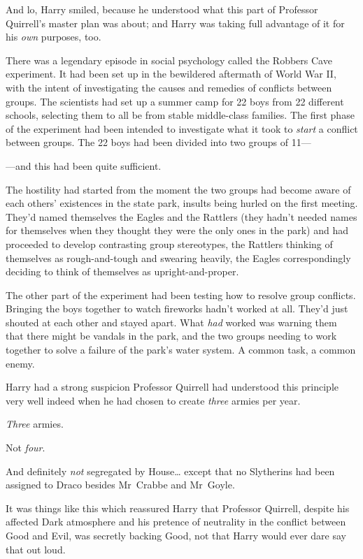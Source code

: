 And lo, Harry smiled, because he understood what this part of Professor Quirrell's master plan was about; and Harry was taking full advantage of it for his \emph{own} purposes, too.

There was a legendary episode in social psychology called the Robbers Cave experiment. It had been set up in the bewildered aftermath of World War II, with the intent of investigating the causes and remedies of conflicts between groups. The scientists had set up a summer camp for 22 boys from 22 different schools, selecting them to all be from stable middle-class families. The first phase of the experiment had been intended to investigate what it took to \emph{start} a conflict between groups. The 22 boys had been divided into two groups of 11—

—and this had been quite sufficient.

The hostility had started from the moment the two groups had become aware of each others' existences in the state park, insults being hurled on the first meeting. They'd named themselves the Eagles and the Rattlers (they hadn't needed names for themselves when they thought they were the only ones in the park) and had proceeded to develop contrasting group stereotypes, the Rattlers thinking of themselves as rough-and-tough and swearing heavily, the Eagles correspondingly deciding to think of themselves as upright-and-proper.

The other part of the experiment had been testing how to resolve group conflicts. Bringing the boys together to watch fireworks hadn't worked at all. They'd just shouted at each other and stayed apart. What \emph{had} worked was warning them that there might be vandals in the park, and the two groups needing to work together to solve a failure of the park's water system. A common task, a common enemy.

Harry had a strong suspicion Professor Quirrell had understood this principle very well indeed when he had chosen to create \emph{three} armies per year.

\emph{Three} armies.

Not \emph{four}.

And definitely \emph{not} segregated by House{\ldots} except that no Slytherins had been assigned to Draco besides Mr~Crabbe and Mr~Goyle.

It was things like this which reassured Harry that Professor Quirrell, despite his affected Dark atmosphere and his pretence of neutrality in the conflict between Good and Evil, was secretly backing Good, not that Harry would ever dare say that out loud.

